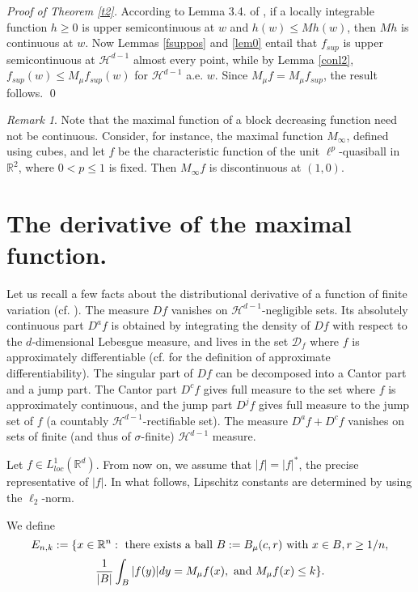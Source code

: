 \documentclass[12pt]{amsart}
\numberwithin{equation}{section}
\theoremstyle{plain}
\theoremstyle{definition}
\theoremstyle{remark}
\newtheorem{remark}[theorem]{Remark}
\begin{document}
{\em Proof of Theorem \ref{t2}.} According to
Lemma 3.4. of \cite{AlPe}, if a locally integrable function $h\ge0$
is upper semicontinuous at $w$ and $h(w) \le M h(w)$, then $Mh$ is
continuous at $w$. Now
 Lemmas \ref{fsuppos} and \ref{lem0} entail  that
 $f_{sup}$
 is upper semicontinuous at $\mathcal{H}^{d-1}$ almost every point,
 while by Lemma \ref{conl2},  $f_{sup}(w) \le M_\mu f_{sup} (w)$
 for
$\mathcal{H}^{d-1}$ a.e. $w$. Since $M_\mu f = M_\mu f_{sup}$,  the result follows.
\qed

\begin{remark}
  Note that the maximal function of a block decreasing function
  need not be continuous. Consider, for instance,
  the maximal function $M_\infty$, defined using cubes,
and let $f$ be the  characteristic function of the unit $\ell^p$-quasiball
in $\mathbb{R}^2$,
where $0<p\le1$ is fixed. Then $M_\infty f$ is discontinuous at $(1,0)$.
\end{remark}

\section{The derivative of the maximal function.}

Let us recall a few facts about the distributional derivative
of a function of finite variation (cf. \cite[p.184--186]{AFP}). The measure $Df$ vanishes on $\mathcal{H}^{d-1}$-negligible sets. Its
absolutely continuous part  $D^af$ is obtained by
integrating the density of
$Df$ with respect to the $d$-dimensional Lebesgue measure, and lives
in the set $\mathcal{D}_f$ where $f$ is approximately differentiable
(cf. \cite[Definition 3.70, p. 165]{AFP} for the definition of
approximate differentiability). The singular part of $Df$ can
be decomposed into a Cantor part and a jump part. The Cantor part $D^cf$
 gives
full measure
to the set where $f$ is
approximately continuous, and the jump part $D^jf$ gives
full measure
to the jump set of $f$ (a
countably $\mathcal{H}^{d-1}$-rectifiable set). The measure
 $D^af+D^cf$
 vanishes on sets of finite (and thus of $\sigma$-finite) $\mathcal{H}^{d-1}$
measure.

Let $f\in L^1_{loc}(\mathbb{R}^d)$.
From now on, we  assume that $|f|=|f|^*$, the precise
representative of $|f|$. In what follows, Lipschitz constants are determined by
using the $\ell_2$-norm.

We define
\begin{equation}\label{enk}
  E_{n,k}:=\{x\in\mathbb{R}^n:  \textnormal{ there exists a ball } B:= B_\mu(c,r) \textnormal{ with  } x\in B ,  r\ge 1/n,
  \end{equation}
  \begin{equation*}
  \frac{1}{|B|}\int_{B} |f(y)|dy =  M_{\mu}f(x), \textnormal{ and } M_{\mu}f(x) \le  k\}.
\end{equation*}
\end{document}
